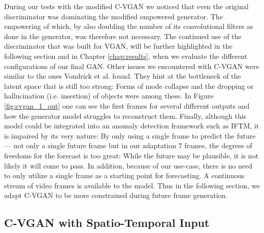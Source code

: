 During our tests with the modified C-VGAN we noticed that even the original discriminator was dominating the modified empowered generator. The empowering of which, by also doubling the number of its convolutional filters as done in the generator, was therefore not necessary. The continued use of the discriminator that was built for VGAN, will be further highlighted in the following section and in Chapter \ref{chap:results}, when we evaluate the different configurations of our final GAN. Other issues we encountered with C-VGAN were similar to the ones Vondrick et al. found. They hint at the bottleneck of the latent space that is still too strong: Forms of mode collapse and the dropping or hallucination (i.e. insertion) of objects were among these. In Figure \ref{fig:cvgan_1_out} one can see the first frames for several different outputs and how the generator model struggles to reconstruct them. Finally, although this model could be integrated into an anomaly detection framework such as IFTM, it is impaired by its very nature: By only using a single frame to predict the future --- not only a single future frame but in our adaptation $7$ frames, the degrees of freedoms for the forecast is too great: While the future may be plausible, it is not likely it will come to pass. In addition, because of our use-case, there is no need to only utilize a single frame as a starting point for forecasting. A continuous stream of video frames is available to the model. Thus in the following section, we adapt C-VGAN to be more constrained during future frame generation.


\subsection{C-VGAN with Spatio-Temporal Input} \label{subsec:vgan_mod_2}

